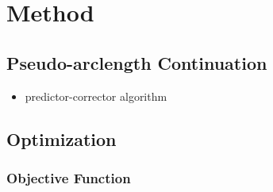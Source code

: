\documentclass{article}[12pt]
\numberwithin{equation}{section}
\begin{document}
\section{Method}

\subsection{Pseudo-arclength Continuation}
\label{sec:continuation}

\begin{itemize}
    \item predictor-corrector algorithm
    \end{itemize}

\subsection{Optimization}

\subsubsection{Objective Function}
\label{sec:objective-function}
\end{document}
